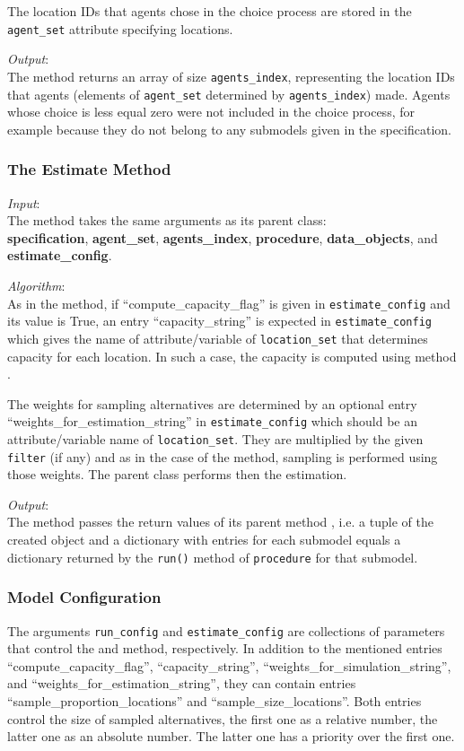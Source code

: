 The location IDs that agents chose in the choice process are stored
in the \verb|agent_set| attribute specifying locations.

{\it Output}:\\[1mm]
The method returns an array of size \verb|agents_index|,
representing the location IDs that agents (elements of
\verb|agent_set| determined by \verb|agents_index|) made. Agents
whose choice is less equal zero were not included in the choice
process, for example because they do not belong to any submodels
given in the specification.


\subsubsection{The Estimate Method}
%
{\it Input}:~\\[1mm]
The  method takes the same arguments as its parent class:\\
{\bf specification}, {\bf agent_set}, {\bf agents_index}, {\bf procedure},
{\bf data_objects}, and {\bf estimate_config}.

{\it Algorithm}:\\[1mm]
As in the  method, if ``compute_capacity_flag'' is given in
\verb|estimate_config| and its value is True, an entry ``capacity_string'' is
expected in \verb|estimate_config| which gives the name of attribute/variable 
of \verb|location_set| that determines capacity for each location. In such a
case, the capacity is computed using method
.

The weights for sampling alternatives are determined by an optional entry
``weights_for_estimation_string'' in \verb|estimate_config| which should be an
attribute/variable name of \verb|location_set|. They are multiplied by the
given \verb|filter| (if any) and as in the case of the  method,
sampling is performed using those weights. The parent class performs then the
estimation.

{\it Output}:\\[1mm]
The method passes the return values of its parent method ,
i.e. a tuple of the created  object and a
dictionary with entries for each submodel equals a dictionary returned by the
\verb|run()| method of \verb|procedure| for that submodel.

%
\subsubsection{Model Configuration}
%
The arguments \verb|run_config| and \verb|estimate_config| are collections of
parameters that control the  and  method,
respectively. In addition to the mentioned entries ``compute_capacity_flag'',
``capacity_string'', ``weights_for_simulation_string'', and ``weights_for_estimation_string'', they can contain entries
``sample_proportion_locations'' and ``sample_size_locations''. Both entries
control the size of sampled alternatives, the first one as a relative number,
the latter one as an absolute number. The latter one has a priority over the
first one.

